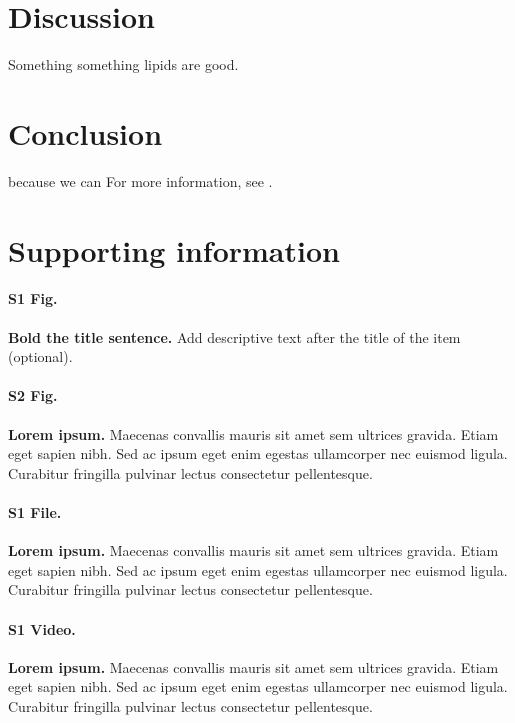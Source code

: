 \documentclass[10pt,letterpaper]{article}
\begin{document}
\section*{Discussion}
Something something lipids are good. 


\section*{Conclusion}

because we can For more information, see .

\section*{Supporting information}

\paragraph*{S1 Fig.}
\label{S1_Fig}
{\bf Bold the title sentence.} Add descriptive text after the title of the item (optional).

\paragraph*{S2 Fig.}
\label{S2_Fig}
{\bf Lorem ipsum.} Maecenas convallis mauris sit amet sem ultrices gravida. Etiam eget sapien nibh. Sed ac ipsum eget enim egestas ullamcorper nec euismod ligula. Curabitur fringilla pulvinar lectus consectetur pellentesque.

\paragraph*{S1 File.}
\label{S1_File}
{\bf Lorem ipsum.}  Maecenas convallis mauris sit amet sem ultrices gravida. Etiam eget sapien nibh. Sed ac ipsum eget enim egestas ullamcorper nec euismod ligula. Curabitur fringilla pulvinar lectus consectetur pellentesque.

\paragraph*{S1 Video.}
\label{S1_Video}
{\bf Lorem ipsum.}  Maecenas convallis mauris sit amet sem ultrices gravida. Etiam eget sapien nibh. Sed ac ipsum eget enim egestas ullamcorper nec euismod ligula. Curabitur fringilla pulvinar lectus consectetur pellentesque.
\end{document}
